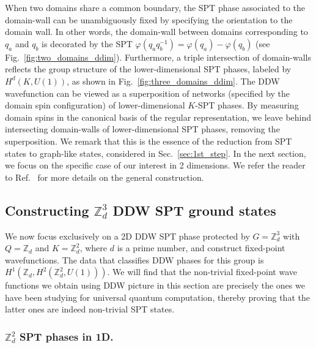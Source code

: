 \documentclass[aps,amsfonts,pra,twocolumn,showpacs]{revtex4-1}
\newcommand{\zd}{\mathbb{Z}_d}
\begin{document}
When two domains share a common boundary, the SPT phase associated to the domain-wall can be unambiguously fixed by specifying  the orientation to the domain wall. In other words, the domain-wall between domains corresponding to $q_a$ and $q_b$ is decorated by the SPT $\varphi(q_a q_b^{-1}) =\varphi(q_a)- \varphi(q_b)$ (see Fig.~\ref{fig:two_domains_ddim}). Furthermore, a triple intersection of domain-walls reflects the group structure of the lower-dimensional SPT phases, labeled by $H^d(K,U(1))$, as shown in Fig.~\ref{fig:three_domains_ddim}.  The DDW wavefunction can be viewed as a superposition of networks (specified by the domain spin configuration) of lower-dimensional $K$-SPT phases. By measuring domain spins in the canonical basis of the regular representation, we leave behind intersecting domain-walls of lower-dimensional SPT phases, removing the superposition. We remark that this is the essence of the reduction from SPT states to graph-like states, considered in Sec.~\ref{sec:1st_step}. In the next section, we focus on the specific case of our interest in 2 dimensions. We refer the reader to Ref.~\cite{Chen2014} for more details on the general construction.


\subsection{Constructing $\mathbb{Z}_d^3$ DDW SPT ground states}
We now focus exclusively on a 2D DDW SPT phase protected by $G = \mathbb{Z}_d^3$ with $Q = \mathbb{Z}_d$ and $K = \mathbb{Z}_d^2$, where $d$ is a prime number, and construct fixed-point wavefunctions. The data that classifies DDW phases for this group is $H^1(\mathbb{Z}_d,H^2(\mathbb{Z}_d^2,U(1)))$. We will find that  the non-trivial fixed-point wave functions we obtain using DDW picture in this section are precisely the ones we have been studying for universal quantum computation, thereby proving that the latter ones are indeed  non-trivial SPT states. 

\subsubsection{$\zd^2$ SPT phases in 1D.}
\end{document}
